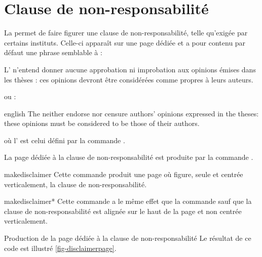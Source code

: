 \section{Clause de non-responsabilité}
\label{sec-clause-de-non}%
%

%
%
La \yatCl{} permet de faire figurer une clause de non-responsabilité, telle
qu'exigée par certains instituts. Celle-ci apparaît sur une page dédiée et
a pour contenu par défaut une phrase semblable à\selonlangue{} :
\begin{displayquote}
  L' n'entend donner aucune approbation ni improbation aux
  opinions \'emises dans les th\`eses : ces opinions devront \^etre
  consid\'er\'ees comme propres \`a leurs auteurs.
\end{displayquote}
ou :
\begin{foreigndisplayquote}{english}
  The  neither endorse nor censure authors' opinions expressed in
  the theses: these opinions must be considered to be those of their authors.
\end{foreigndisplayquote}
où l' est celui défini par la commande 
.

La page dédiée à la clause de non-responsabilité est produite par la commande
.

\begin{docCommand}{makedisclaimer}{}
  Cette commande produit une page où figure, seule et centrée
  verticalement, la clause de non-responsabilité.
\end{docCommand}

\begin{docCommand}{makedisclaimer*}{}
  Cette commande a le même effet que la commande
   sauf que la clause de non-responsabilité est alignée
  sur le haut de la page et non centrée verticalement.
\end{docCommand}

\begin{dbexample}{Production de la page dédiée à la clause de
    non-responsabilité}{}
  \NoAutoSpacing%
  Le résultat de ce code est illustré \vref{fig-disclaimerpage}.
\end{dbexample}

